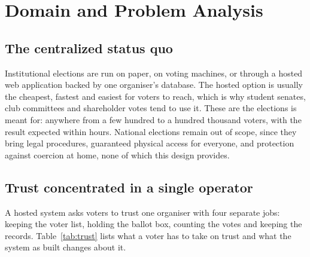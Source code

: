 \section{Domain and Problem Analysis}

\subsection{The centralized status quo}

Institutional elections are run on paper, on voting machines, or through a
hosted web application backed by one organiser's database. The hosted option is
usually the cheapest, fastest and easiest for voters to reach, which is why
student senates, club committees and shareholder votes tend to use it. These
are the elections \projectname{} is meant for: anywhere from a few hundred to a
hundred thousand voters, with the result expected within hours. National
elections remain out of scope, since they bring legal procedures, guaranteed
physical access for everyone, and protection against coercion at home, none of
which this design provides.

\subsection{Trust concentrated in a single operator}

A hosted system asks voters to trust one organiser with four separate jobs:
keeping the voter list, holding the ballot box, counting the votes and keeping
the records. Table~\ref{tab:trust} lists what a voter has to take on trust and
what the system as built changes about it.

